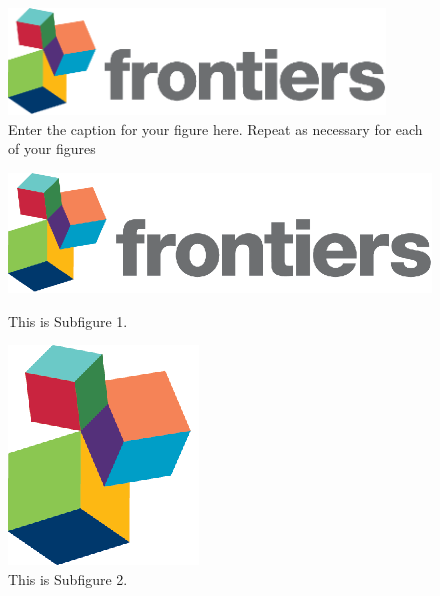 \documentclass[utf8]{FrontiersinHarvard} %
\renewcommand*{\|}[1][]{\nonscript\:#1\vert\nonscript\:\mathopen{}}
\begin{document}
\begin{figure}[h!]
\begin{center}
\includegraphics[width=10cm]{logo1}%
\end{center}
\caption{ Enter the caption for your figure here.  Repeat as  necessary for each of your figures}\label{fig:1}
\end{figure}

\setcounter{figure}{2}
\setcounter{subfigure}{0}
\begin{subfigure}
\setcounter{figure}{2}
\setcounter{subfigure}{0}
    \centering
    \begin{minipage}[b]{0.5\textwidth}
        \includegraphics[width=\linewidth]{logo1.eps}
        \caption{This is Subfigure 1.}
        \label{fig:Subfigure 1}
    \end{minipage}  
   
\setcounter{figure}{2}
\setcounter{subfigure}{1}
    \begin{minipage}[b]{0.5\textwidth}
        \includegraphics[width=\linewidth]{logo2.eps}
        \caption{This is Subfigure 2.}
        \label{fig:Subfigure 2}
    \end{minipage}


\end{subfigure}
\end{document}
